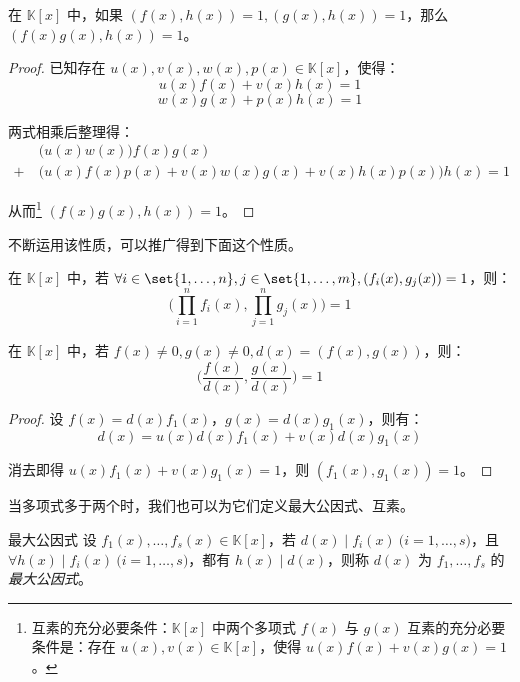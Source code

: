 \begin{proposition}
	在 $\mathbb K[x]$ 中，如果 $(f(x), h(x))= 1, (g(x), h(x)) = 1$，那么 $(f(x) g(x), h(x)) = 1$。
\end{proposition}

\begin{proof}
	已知存在 $u(x), v(x), w(x), p(x) \in \mathbb K[x]$，使得：
	$$
	u(x) f(x) + v(x) h(x) = 1
	$$$$
	w(x) g(x) + p(x) h(x) = 1
	$$

	两式相乘后整理得：
	$$
	\begin{aligned}&
		\bigl( u(x) w(x) \bigr) f(x) g(x)
		\\+~&
		\bigl( u(x) f(x) p(x) + v(x) w(x) g(x) + v(x) h(x) p(x) \bigr) h(x) = 1
	\end{aligned}
	$$

	从而\footnote{互素的充分必要条件：$\mathbb K[x]$ 中两个多项式 $f(x)$ 与 $g(x)$ 互素的充分必要条件是：存在 $u(x), v(x) \in \mathbb K[x]$，使得 $u(x) f(x) + v(x) g(x) = 1$。} $(f(x) g(x), h(x)) = 1$。
\end{proof}

不断运用该性质，可以推广得到下面这个性质。

\begin{proposition}
	在 $\mathbb K[x]$ 中，若 $\forall i \in \set{1, \ldots, n}, j \in \set{1, \ldots, m}, (f_i(x), g_j(x)) = 1$，则：
	$$
	\biggl( \prod\limits_{i = 1}^n f_i(x), \prod\limits_{j = 1}^n g_j(x) \biggr) = 1
	$$
\end{proposition}

\begin{proposition}
	在 $\mathbb K[x]$ 中，若 $f(x) \ne 0, g(x) \ne 0, d(x) = (f(x), g(x))$，则：
	$$
	\biggl( \dfrac{f(x)}{d(x)}, \dfrac{g(x)}{d(x)} \biggr) = 1
	$$
\end{proposition}

\begin{proof}
	设 $f(x) = d(x) f_1(x)$，$g(x) = d(x) g_1(x)$，则有：
	$$
	d(x) = u(x) d(x) f_1(x) + v(x) d(x) g_1(x)
	$$

	消去即得 $u(x) f_1(x) + v(x) g_1(x) = 1$，则 $(f_1(x), g_1(x)) = 1$。
\end{proof}

当多项式多于两个时，我们也可以为它们定义最大公因式、互素。

\begin{definition}{最大公因式}
	设 $f_1(x), \ldots, f_s(x) \in \mathbb K[x]$，若 $d(x) \mid f_i(x) \pod{i = 1, \ldots, s}$，且 $\forall h(x) \mid f_i(x) \pod{i = 1, \ldots, s}$，都有 $h(x) \mid d(x)$，则称 $d(x)$ 为 $f_1, \ldots, f_s$ 的\emph{最大公因式}。
\end{definition}

